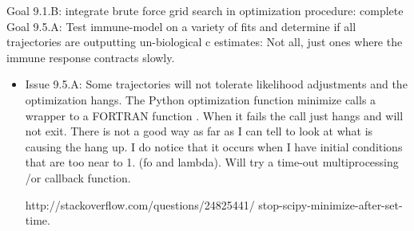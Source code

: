 \documentclass[letterpaper,index=totoc,hyperref,openany]{labbook} %
\begin{document}


Goal 9.1.B: integrate brute force grid search in optimization procedure: complete
\newline \newline
Goal 9.5.A: Test immune-model on a variety of fits and determine if all trajectories are outputting un-biological c estimates: Not all, just ones where the immune response
contracts slowly. 






\begin{itemize}
\item{Issue 9.5.A: Some trajectories will not tolerate likelihood adjustments and the optimization hangs. The Python optimization function minimize calls a  wrapper to a FORTRAN function . When it fails the call just hangs and will not exit. There is not a good way as far as I can tell to look at what is causing the hang up. I do notice that it occurs when I have initial conditions that are too near to 1. (fo and lambda). Will try a time-out  multiprocessing /or callback function.  

http://stackoverflow.com/questions/24825441/
stop-scipy-minimize-after-set-time.}
\end{itemize}
\end{document}
